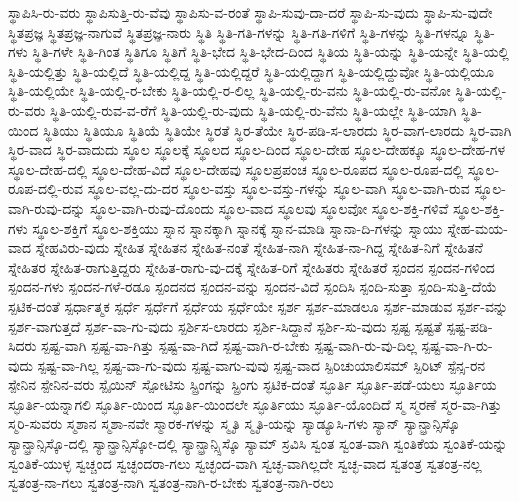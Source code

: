 {ಸ್ಥಾಪಿಸಿ-ರು-ವರು
ಸ್ಥಾಪಿಸುತ್ತಿ-ರು-ವೆವು
ಸ್ಥಾಪಿಸು-ವ-ರಂತೆ
ಸ್ಥಾಪಿ-ಸುವು-ದಾ-ದರೆ
ಸ್ಥಾಪಿ-ಸು-ವುದು
ಸ್ಥಾಪಿ-ಸು-ವುದೇ
ಸ್ಥಿತಪ್ರಜ್ಞ
ಸ್ಥಿತಪ್ರಜ್ಞ-ನಾಗುವೆ
ಸ್ಥಿತಪ್ರಜ್ಞ-ನಾರು
ಸ್ಥಿತಿ
ಸ್ಥಿತಿ-ಗತಿ-ಗಳನ್ನು
ಸ್ಥಿತಿ-ಗತಿ-ಗಳಿಗೆ
ಸ್ಥಿತಿ-ಗಳನ್ನು
ಸ್ಥಿತಿ-ಗಳನ್ನೂ
ಸ್ಥಿತಿ-ಗಳು
ಸ್ಥಿತಿ-ಗಳೇ
ಸ್ಥಿತಿ-ಗಿಂತ
ಸ್ಥಿತಿಗೂ
ಸ್ಥಿತಿಗೆ
ಸ್ಥಿತಿ-ಭೇದ
ಸ್ಥಿತಿ-ಭೇದ-ದಿಂದ
ಸ್ಥಿತಿಯ
ಸ್ಥಿತಿ-ಯನ್ನು
ಸ್ಥಿತಿ-ಯನ್ನೇ
ಸ್ಥಿತಿ-ಯಲ್ಲಿ
ಸ್ಥಿತಿ-ಯಲ್ಲಿತ್ತು
ಸ್ಥಿತಿ-ಯಲ್ಲಿದೆ
ಸ್ಥಿತಿ-ಯಲ್ಲಿದ್ದ
ಸ್ಥಿತಿ-ಯಲ್ಲಿದ್ದರೆ
ಸ್ಥಿತಿ-ಯಲ್ಲಿದ್ದಾಗ
ಸ್ಥಿತಿ-ಯಲ್ಲಿದ್ದುವೋ
ಸ್ಥಿತಿ-ಯಲ್ಲಿಯೂ
ಸ್ಥಿತಿ-ಯಲ್ಲಿಯೇ
ಸ್ಥಿತಿ-ಯಲ್ಲಿ-ರ-ಬೇಕು
ಸ್ಥಿತಿ-ಯಲ್ಲಿ-ರ-ಲಿಲ್ಲ
ಸ್ಥಿತಿ-ಯಲ್ಲಿ-ರು-ವನು
ಸ್ಥಿತಿ-ಯಲ್ಲಿ-ರು-ವನೋ
ಸ್ಥಿತಿ-ಯಲ್ಲಿ-ರು-ವರು
ಸ್ಥಿತಿ-ಯಲ್ಲಿ-ರುವ-ವ-ರೆಗೆ
ಸ್ಥಿತಿ-ಯಲ್ಲಿ-ರು-ವುದು
ಸ್ಥಿತಿ-ಯಲ್ಲಿ-ರು-ವೆನು
ಸ್ಥಿತಿ-ಯಲ್ಲೇ
ಸ್ಥಿತಿ-ಯಾಗಿ
ಸ್ಥಿತಿ-ಯಿಂದ
ಸ್ಥಿತಿಯು
ಸ್ಥಿತಿಯೂ
ಸ್ಥಿತಿಯೆ
ಸ್ಥಿತಿಯೇ
ಸ್ಥಿರತೆ
ಸ್ಥಿರ-ತೆಯೇ
ಸ್ಥಿರ-ಪಡಿ-ಸ-ಲಾರದು
ಸ್ಥಿರ-ವಾಗ-ಲಾರದು
ಸ್ಥಿರ-ವಾಗಿ
ಸ್ಥಿರ-ವಾದ
ಸ್ಥಿರ-ವಾದುದು
ಸ್ಥೂಲ
ಸ್ಥೂಲಕ್ಕೆ
ಸ್ಥೂಲದ
ಸ್ಥೂಲ-ದಿಂದ
ಸ್ಥೂಲ-ದೇಹ
ಸ್ಥೂಲ-ದೇಹಕ್ಕೂ
ಸ್ಥೂಲ-ದೇಹ-ಗಳ
ಸ್ಥೂಲ-ದೇಹ-ದಲ್ಲಿ
ಸ್ಥೂಲ-ದೇಹ-ವಿದೆ
ಸ್ಥೂಲ-ದೇಹವು
ಸ್ಥೂಲಪ್ರಪಂಚ
ಸ್ಥೂಲ-ರೂಪದ
ಸ್ಥೂಲ-ರೂಪ-ದಲ್ಲಿ
ಸ್ಥೂಲ-ರೂಪ-ದಲ್ಲಿ-ರುವ
ಸ್ಥೂಲ-ವಲ್ಲ-ದು-ದರ
ಸ್ಥೂಲ-ವಸ್ತು
ಸ್ಥೂಲ-ವಸ್ತು-ಗಳನ್ನು
ಸ್ಥೂಲ-ವಾಗಿ
ಸ್ಥೂಲ-ವಾಗಿ-ರುವ
ಸ್ಥೂಲ-ವಾಗಿ-ರುವು-ದನ್ನು
ಸ್ಥೂಲ-ವಾಗಿ-ರುವು-ದೊಂದು
ಸ್ಥೂಲ-ವಾದ
ಸ್ಥೂಲವು
ಸ್ಥೂಲವೋ
ಸ್ಥೂಲ-ಶಕ್ತಿ-ಗಳಿವೆ
ಸ್ಥೂಲ-ಶಕ್ತಿ-ಗಳು
ಸ್ಥೂಲ-ಶಕ್ತಿಗೆ
ಸ್ಥೂಲ-ಶಕ್ತಿಯು
ಸ್ನಾನ
ಸ್ನಾನಕ್ಕಾಗಿ
ಸ್ನಾನಕ್ಕೆ
ಸ್ನಾನ-ಮಾಡಿ
ಸ್ನಾನಾ-ದಿ-ಗಳನ್ನು
ಸ್ನಾಯು
ಸ್ನೇಹ-ಮಯ-ವಾದ
ಸ್ನೇಹವಿರು-ವುದು
ಸ್ನೇಹಿತ
ಸ್ನೇಹಿತನ
ಸ್ನೇಹಿತ-ನಂತೆ
ಸ್ನೇಹಿತ-ನಾಗಿ
ಸ್ನೇಹಿತ-ನಾ-ಗಿದ್ದ
ಸ್ನೇಹಿತ-ನಿಗೆ
ಸ್ನೇಹಿತನೆ
ಸ್ನೇಹಿತರ
ಸ್ನೇಹಿತ-ರಾಗುತ್ತಿದ್ದರು
ಸ್ನೇಹಿತ-ರಾಗು-ವು-ದಕ್ಕೆ
ಸ್ನೇಹಿತ-ರಿಗೆ
ಸ್ನೇಹಿತರು
ಸ್ನೇಹಿತರೆ
ಸ್ಪಂದನ
ಸ್ಪಂದನ-ಗಳಿಂದ
ಸ್ಪಂದನ-ಗಳು
ಸ್ಪಂದನ-ಗಳೆ-ರಡೂ
ಸ್ಪಂದನದ
ಸ್ಪಂದನ-ವನ್ನು
ಸ್ಪಂದನ-ವಿದೆ
ಸ್ಪಂದಿಸಿ
ಸ್ಪಂದಿ-ಸುತ್ತಾ
ಸ್ಪಂದಿ-ಸುತ್ತಿ-ದೆಯೆ
ಸ್ಪಟಿಕ-ದಂತೆ
ಸ್ಪರ್ಧಾತ್ಮಕ
ಸ್ಪರ್ಧೆ
ಸ್ಪರ್ಧೆಗೆ
ಸ್ಪರ್ಧೆಯ
ಸ್ಪರ್ಧೆಯೇ
ಸ್ಪರ್ಶ
ಸ್ಪರ್ಶ-ಮಾಡಲೂ
ಸ್ಪರ್ಶ-ಮಾಡುವ
ಸ್ಪರ್ಶ-ವನ್ನು
ಸ್ಪರ್ಶ-ವಾಗುತ್ತದೆ
ಸ್ಪರ್ಶ-ವಾ-ಗು-ವುದು
ಸ್ಪರ್ಶಿಸ-ಲಾರದು
ಸ್ಪರ್ಶಿ-ಸಿದ್ದಾನೆ
ಸ್ಪರ್ಶಿ-ಸು-ವುದು
ಸ್ಪಷ್ಟ
ಸ್ಪಷ್ಟತೆ
ಸ್ಪಷ್ಟ-ಪಡಿ-ಸಿದರು
ಸ್ಪಷ್ಟ-ವಾಗಿ
ಸ್ಪಷ್ಟ-ವಾ-ಗಿತ್ತು
ಸ್ಪಷ್ಟ-ವಾ-ಗಿದೆ
ಸ್ಪಷ್ಟ-ವಾಗಿ-ರ-ಬೇಕು
ಸ್ಪಷ್ಟ-ವಾಗಿ-ರು-ವು-ದಿಲ್ಲ
ಸ್ಪಷ್ಟ-ವಾ-ಗಿ-ರು-ವುದು
ಸ್ಪಷ್ಟ-ವಾ-ಗಿಲ್ಲ
ಸ್ಪಷ್ಟ-ವಾ-ಗು-ವುದು
ಸ್ಪಷ್ಟ-ವಾಗು-ವುವು
ಸ್ಪಷ್ಟ-ವಾದ
ಸ್ಪಿರಿಚುಯಾಲಿಸಮ್
ಸ್ಪಿರಿಟ್
ಸ್ಪೆನ್ಸ-ರನ
ಸ್ಪೇನಿನ
ಸ್ಪೇನಿನ-ವರು
ಸ್ಪೈಯಿನ್
ಸ್ಪೋಟಿಸು
ಸ್ಪ್ರಿಂಗನ್ನು
ಸ್ಪ್ರಿಂಗು
ಸ್ಫಟಿಕ-ದಂತೆ
ಸ್ಫೂರ್ತಿ
ಸ್ಫೂರ್ತಿ-ಪಡೆ-ಯಲು
ಸ್ಫೂರ್ತಿಯ
ಸ್ಫೂರ್ತಿ-ಯನ್ನಾಗಲಿ
ಸ್ಫೂರ್ತಿ-ಯಿಂದ
ಸ್ಫೂರ್ತಿ-ಯಿಂದಲೇ
ಸ್ಫೂರ್ತಿಯು
ಸ್ಫೂರ್ತಿ-ಯೊಂದಿದೆ
ಸ್ಮ
ಸ್ಮರಣೆ
ಸ್ಮರ-ವಾ-ಗಿತ್ತು
ಸ್ಮರಿ-ಸುವರು
ಸ್ಮಶಾನ
ಸ್ಮಶಾ-ನವೇ
ಸ್ಮಾರಕ-ಗಳನ್ನು
ಸ್ಮೃತಿ
ಸ್ಮೃತಿ-ಯನ್ನು
ಸ್ಯಾಡ್ಯೂಸಿ-ಗಳು
ಸ್ಯಾನ್
ಸ್ಯಾನ್ಫ್ರಾನ್ಸಿಸ್ಕೊ
ಸ್ಯಾನ್ಫ್ರಾನ್ಸಿಸ್ಕೊ-ದಲ್ಲಿ
ಸ್ಯಾನ್ಫ್ರಾನ್ಸಿಸ್ಕೋ-ದಲ್ಲಿ
ಸ್ಯಾನ್ಫ್ರಾನ್ಸ್ಸಿಸ್ಕೊ
ಸ್ಯಾಮ್
ಸ್ರವಿಸಿ
ಸ್ವಂತ
ಸ್ವಂತ-ವಾಗಿ
ಸ್ವಂತಿಕೆಯ
ಸ್ವಂತಿಕೆ-ಯನ್ನು
ಸ್ವಂತಿಕೆ-ಯುಳ್ಳ
ಸ್ವಚ್ಚಂದ
ಸ್ವಚ್ಛಂದರಾ-ಗಲು
ಸ್ವಚ್ಛಂದ-ವಾಗಿ
ಸ್ವಚ್ಛ-ವಾಗಿಲ್ಲದೇ
ಸ್ವಚ್ಛ-ವಾದ
ಸ್ವತಂತ್ರ
ಸ್ವತಂತ್ರ-ನಲ್ಲ
ಸ್ವತಂತ್ರ-ನಾ-ಗಲು
ಸ್ವತಂತ್ರ-ನಾಗಿ
ಸ್ವತಂತ್ರ-ನಾಗಿ-ರ-ಬೇಕು
ಸ್ವತಂತ್ರ-ನಾಗಿ-ರಲು
}
